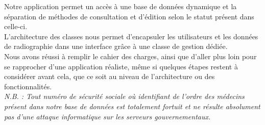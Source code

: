 \documentclass[12pt,a4paper]{article}
\begin{document}
\begin{multicols}{2}
		Notre application permet un accès à une base de données dynamique et la séparation de méthodes de consultation et d'édition selon le statut présent dans celle-ci. \\
		
		L'architecture des classes nous permet d'encapsuler les utilisateurs et les données de radiographie dans une interface grâce à une classe de gestion dédiée. \\
		
		Nous avons réussi à remplir le cahier des charges, ainsi que d'aller plus loin pour se rapprocher d'une application réaliste, même si quelques étapes restent à considérer avant cela, que ce soit au niveau de l'architecture ou des fonctionnalités. \\
		
		\textit{N.B. : Tout numéro de sécurité sociale où identifiant de l'ordre des médecins présent dans notre base de données est totalement fortuit et ne résulte absolument pas d'une attaque informatique sur les serveurs gouvernementaux.} \\
		
	\end{multicols}
	
\end{document}
